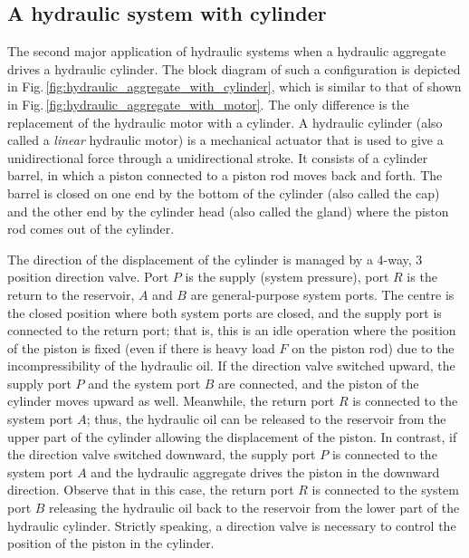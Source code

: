 \subsection{A hydraulic system with cylinder} \label{sec:hydraulic_system_with_cylinder}
The second major application of hydraulic systems when a hydraulic aggregate drives a hydraulic cylinder. The block diagram of such a configuration is depicted in Fig.\,\ref{fig:hydraulic_aggregate_with_cylinder}, which is similar to that of shown in Fig.\,\ref{fig:hydraulic_aggregate_with_motor}. The only difference is the replacement of the hydraulic motor with a cylinder. A hydraulic cylinder (also called a \textit{linear} hydraulic motor) is a mechanical actuator that is used to give a unidirectional force through a unidirectional stroke. It consists of a cylinder barrel, in which a piston connected to a piston rod moves back and forth. The barrel is closed on one end by the bottom of the cylinder (also called the cap) and the other end by the cylinder head (also called the gland) where the piston rod comes out of the cylinder. 

The direction of the displacement of the cylinder is managed by a 4-way, 3 position direction valve. Port $P$ is the supply (system pressure), port $R$ is the return to the reservoir, $A$ and $B$ are general-purpose system ports. The centre is the closed position where both system ports are closed, and the supply port is connected to the return port; that is, this is an idle operation where the position of the piston is fixed (even if there is heavy load $F$ on the piston rod) due to the incompressibility of the hydraulic oil. If the direction valve switched upward, the supply port $P$ and the system port $B$ are connected, and the piston of the cylinder moves upward as well. Meanwhile, the return port $R$ is connected to the system port $A$; thus, the hydraulic oil can be released to the reservoir from the upper part of the cylinder allowing the displacement of the piston. In contrast, if the direction valve switched downward, the supply port $P$ is connected to the system port $A$ and the hydraulic aggregate drives the piston in the downward direction. Observe that in this case, the return port $R$ is connected to the system port $B$ releasing the hydraulic oil back to the reservoir from the lower part of the hydraulic cylinder. Strictly speaking, a direction valve is necessary to control the position of the piston in the cylinder.

